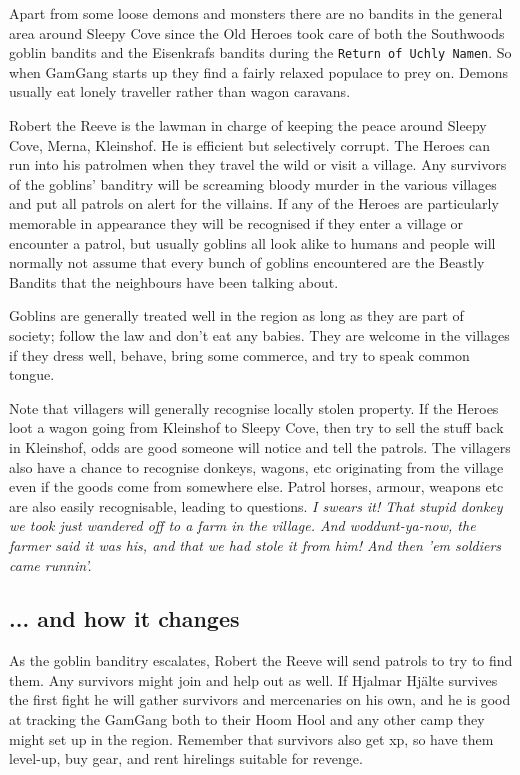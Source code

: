 Apart from some loose demons and monsters there are no bandits in the general area around Sleepy Cove since the Old Heroes took care of both the Southwoods goblin bandits and the Eisenkrafs bandits during the \texttt{Return of Uchly Namen}. So when GamGang starts up they find a fairly relaxed populace to prey on. Demons usually eat lonely traveller rather than wagon caravans.

Robert the Reeve is the lawman in charge of keeping the peace around Sleepy Cove, Merna, Kleinshof. He is efficient but selectively corrupt. The Heroes can run into his patrolmen when they travel the wild or visit a village. Any survivors of the goblins' banditry will be screaming bloody murder in the various villages and put all patrols on alert for the villains. If any of the Heroes are particularly memorable in appearance they will be recognised if they enter a village or encounter a patrol, but usually goblins all look alike to humans and people will normally not assume that every bunch of goblins encountered are the Beastly Bandits that the neighbours have been talking about.

Goblins are generally treated well in the region as long as they are part of society; follow the law and don't eat any babies. They are welcome in the villages if they dress well, behave, bring some commerce, and try to speak common tongue.

Note that villagers will generally recognise locally stolen property. If the Heroes loot a wagon going from Kleinshof to Sleepy Cove, then try to sell the stuff back in Kleinshof, odds are good someone will notice and tell the patrols. The villagers also have a chance to recognise donkeys, wagons, etc originating from the village even if the goods come from somewhere else. Patrol horses, armour, weapons etc are also easily recognisable, leading to questions.
\textit{I swears it! That stupid donkey we took just wandered off to a farm in the village. And woddunt-ya-now, the farmer said it was his, and that we had stole it from him! And then 'em soldiers came runnin'.}

\subsection*{... and how it changes}

As the goblin banditry escalates, Robert the Reeve will send patrols to try to find them. Any survivors might join and help out as well. If Hjalmar Hjälte survives the first fight he will gather survivors and mercenaries on his own, and he is good at tracking the GamGang both to their Hoom Hool and any other camp they might set up in the region. Remember that survivors also get xp, so have them level-up, buy gear, and rent hirelings suitable for revenge.

